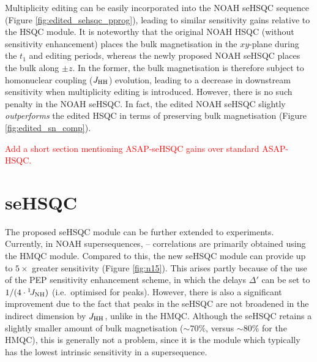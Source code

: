 \documentclass[11pt]{article}
\newcommand*{\proton}{\ce{^{1}H}}
\newcommand*{\nitrogen}{\ce{^{15}N}}
\newcommand*{\red}[1]{\textcolor{red}{#1}}
\newcommand*{\onejnh}{{}^{1}\!J_{\ce{NH}}}
\newcommand*{\jhh}{J_{\ce{HH}}}
\newcommand*{\figref}[1]{Figure \ref{fig:#1}}
\begin{document}
Multiplicity editing can be easily incorporated into the NOAH seHSQC sequence (\figref{edited_sehsqc_pprog}), leading to similar sensitivity gains relative to the HSQC module.
It is noteworthy that the original NOAH HSQC (without sensitivity enhancement) places the bulk magnetisation in the $xy$-plane during the $t_1$ and editing periods, whereas the newly proposed NOAH seHSQC places the bulk along $\pm z$.
In the former, the bulk magnetisation is therefore subject to homonuclear coupling ($\jhh$) evolution, leading to a decrease in downstream sensitivity when multiplicity editing is introduced.
However, there is no such penalty in the NOAH seHSQC.
In fact, the edited NOAH seHSQC slightly \textit{outperforms} the edited HSQC in terms of preserving bulk magnetisation (\figref{edited_sn_comp}).

\red{Add a short section mentioning ASAP-seHSQC gains over standard ASAP-HSQC.}


\section*{\texorpdfstring{\nitrogen{}}{15N} seHSQC}

The proposed seHSQC module can be further extended to \nitrogen{} experiments.
Currently, in NOAH supersequences, \nitrogen{}--\proton{} correlations are primarily obtained using the HMQC module.\autocite{Kupce2007MRC, Kupce2017ACIE}
Compared to this, the new seHSQC module can provide up to $5\times$ greater sensitivity (\figref{n15}).
This arises partly because of the use of the PEP sensitivity enhancement scheme, in which the delays $\Delta'$ can be set to $1/(4 \cdot \onejnh)$ (i.e.\ optimised for  peaks).
However, there is also a significant improvement due to the fact that peaks in the seHSQC are not broadened in the indirect dimension by $\jhh$, unlike in the HMQC.
Although the seHSQC retains a slightly smaller amount of bulk magnetisation ($\sim 70\%$, versus $\sim 80\%$ for the HMQC), this is generally not a problem, since it is the \nitrogen{} module which typically has the lowest intrinsic sensitivity in a supersequence.
\end{document}
